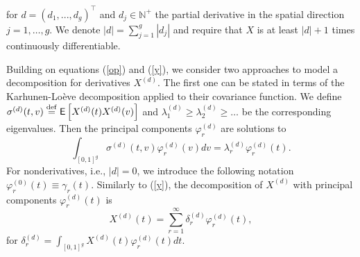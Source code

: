 for $d=(d_1,...,d_g)^{\top}$ and $d_j\in \mathbb{N}^+$ the partial derivative in the spatial direction $j=1,\dots,g$.
We denote $|d|=\sum_{j=1}^g |d_j|$ and require that $X$ is at least $|d|+1$ times continuously differentiable. %

Building on equations (\ref{op}) and (\ref{y}), we consider two approaches to model a decomposition for derivatives $X^{(d)}$. The first one can be stated in terms of the Karhunen-Lo\`eve decomposition applied to their covariance function.  %
We define $\sigma^{(d)}(t,v) \stackrel{\operatorname{def}}{=} \mathop{\mbox{\sf E}}\left[X^{(d)}(t)X^{(d)}(v)\right]$ and $\lambda_1^{(d)}\geq\lambda_2^{(d)}\geq \dots$ be the  corresponding eigenvalues. Then the principal components $\varphi^{(d)}_{r}$ are solutions to
\begin{equation}\label{alter}
\int_{[0,1]^g} \sigma^{(d)}(t,v) \varphi^{(d)}_r(v) dv = \lambda^{(d)}_r \varphi^{(d)}_r(t).
\end{equation}
For nonderivatives, i.e., $|d|=0$, we introduce the following notation $\varphi_r^{(0)}(t)\equiv \gamma_r(t)$. Similarly to (\ref{y}), the decomposition of $X^{(d)}$ with principal components $ \varphi_r^{(d)}(t)$ is  
\begin{equation}\label{alterdec}
X^{(d)}(t) =  \sum_{r=1}^\infty \delta^{(d)}_{r}  \varphi^{(d)}_r(t),
\end{equation}
for $\delta^{(d)}_r = \int_{[0,1]^g} X^{(d)}(t) \varphi^{(d)}_r(t) dt$.

